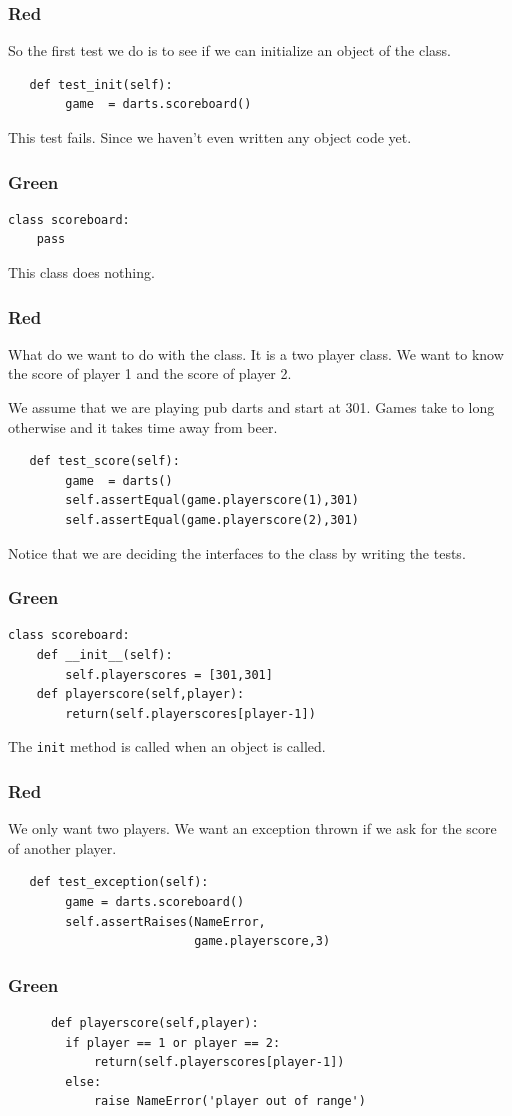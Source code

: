\documentclass{beamer}
\begin{document}
\begin{frame}[fragile]
  \frametitle{Red}
So the first test we do is to see if we can initialize an object of
the class.

\begin{lstlisting}
   def test_init(self):
        game  = darts.scoreboard()
\end{lstlisting}
This test fails. Since we haven't even written any object code yet.
\end{frame}
\begin{frame}[fragile]
\frametitle{Green}
\begin{lstlisting}
class scoreboard:
    pass
\end{lstlisting}
This class does nothing.  
\end{frame}
\begin{frame}[fragile]
\frametitle{Red}
What do we want to do with the class. It is a two player class. We
want to know the score of player 1 and the score of player 2.

We assume that we are playing pub darts and start at 301. Games take
to long otherwise and it takes time away from beer.
\begin{lstlisting}
   def test_score(self):
        game  = darts()
        self.assertEqual(game.playerscore(1),301)
        self.assertEqual(game.playerscore(2),301)
\end{lstlisting}
Notice that we are deciding the interfaces to the class by writing the tests.
\end{frame}
\begin{frame}[fragile]
\frametitle{Green}
\begin{lstlisting}
class scoreboard:
    def __init__(self):
        self.playerscores = [301,301]
    def playerscore(self,player):
        return(self.playerscores[player-1])
\end{lstlisting}
The {\tt init} method is called when an object is called.  
\end{frame}
\begin{frame}[fragile]
\frametitle{Red}
We only want two players. We want an exception thrown if we ask for
the score of another player.
\begin{lstlisting}
   def test_exception(self):
        game = darts.scoreboard()
        self.assertRaises(NameError,
                          game.playerscore,3)
\end{lstlisting}
\end{frame}

\begin{frame}[fragile]
\frametitle{Green}
\begin{lstlisting}
      def playerscore(self,player):
        if player == 1 or player == 2:
            return(self.playerscores[player-1])
        else:
            raise NameError('player out of range')
\end{lstlisting}
    
\end{frame}
\end{document}
